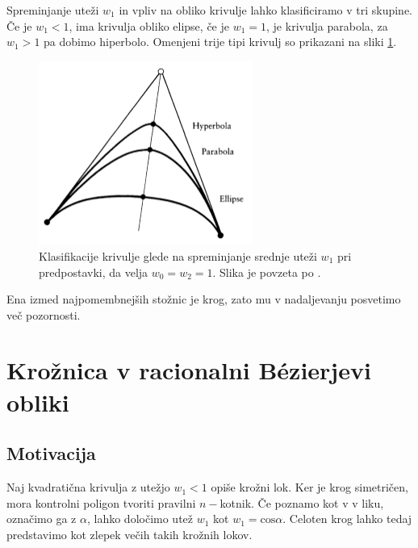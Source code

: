 \documentclass[a4paper,11pt]{article}
\theoremstyle{definition}
\theoremstyle{plain}
\begin{document}
\newpage
Spreminjanje uteži $w_1$ in vpliv na obliko krivulje lahko klasificiramo v tri skupine. Če je $w_1 < 1$, ima krivulja obliko elipse, če je $w_1 = 1$, je krivulja parabola, za $w_1 > 1$ pa dobimo hiperbolo. Omenjeni trije tipi krivulj so prikazani na sliki \ref{slika:klasifikacija}.

\begin{figure}[ht!]
    \centering
    \includegraphics[width=70mm]{tri_oblike.png}
    \caption{Klasifikacije krivulje glede na spreminjanje srednje uteži $w_1$ pri predpostavki, da velja $w_0 = w_2 = 1$. Slika je povzeta po \cite{farin}.}
    \label{slika:klasifikacija}
\end{figure}
\noindent
Ena izmed najpomembnejših stožnic je krog, zato mu v nadaljevanju posvetimo več pozornosti.



\section{Krožnica v racionalni B\'ezierjevi obliki}

\subsection{Motivacija}

Naj kvadratična krivulja z utežjo $w_1 < 1$ opiše krožni lok. Ker je krog simetričen, mora kontrolni poligon tvoriti pravilni $n-$kotnik.
Če poznamo kot v v liku, označimo ga z $\alpha$, lahko določimo utež $w_1$ kot $w_1 = \text{cos} \alpha$.
Celoten krog lahko tedaj predstavimo kot zlepek večih takih krožnih lokov. 
\end{document}
